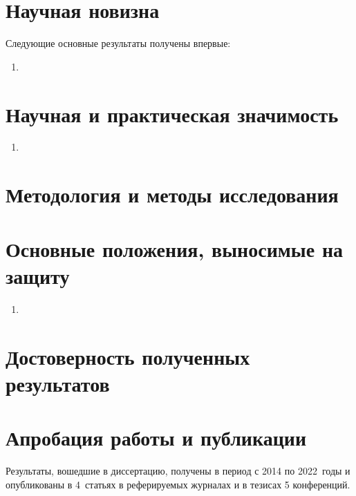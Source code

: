 \section*{Научная новизна}

Следующие основные результаты получены впервые:
\begin{enumerate}
\item 
\end{enumerate}

\section*{Научная и практическая значимость}

\begin{enumerate}
\item 
\end{enumerate}

\section*{Методология и методы исследования}


\section*{Основные положения, выносимые на защиту}

\begin{enumerate}
\item 
\end{enumerate}

\section*{Достоверность полученных результатов}

\section*{Апробация работы и публикации}
Результаты, вошедшие в диссертацию, получены в период с 2014 по 2022~годы и 
опубликованы в 4~статьях в реферируемых журналах и в тезисах 5 конференций. 

